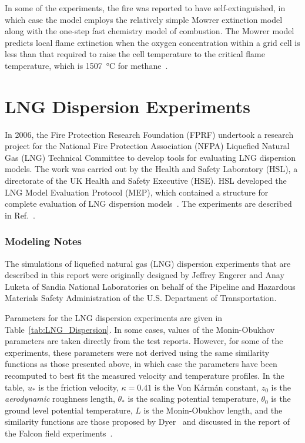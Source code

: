 In some of the experiments, the fire was reported to have self-extinguished, in which case the model employs the relatively simple Mowrer extinction model along with the one-step fast chemistry model of combustion. The Mowrer model predicts local flame extinction when the oxygen concentration within a grid cell is less than that required to raise the cell temperature to the critical flame temperature, which is 1507~\unit{\degreeCelsius} for methane~\cite{SFPE:Beyler}.


\section{LNG Dispersion Experiments}
\label{LNG_Dispersion_Description}

In 2006, the Fire Protection Research Foundation (FPRF) undertook a research project for the National Fire Protection Association (NFPA) Liquefied Natural Gas (LNG) Technical Committee to develop tools for evaluating LNG dispersion models. The work was carried out by the Health and Safety Laboratory (HSL), a directorate of the UK Health and Safety Executive (HSE). HSL developed the LNG Model Evaluation Protocol (MEP), which contained a structure for complete evaluation of LNG dispersion models~\cite{Ivings:HSL}. The experiments are described in Ref.~\cite{Stewart:HSL}.

\subsubsection{Modeling Notes}

The simulations of liquefied natural gas (LNG) dispersion experiments that are described in this report were originally designed by Jeffrey Engerer and Anay Luketa of Sandia National Laboratories on behalf of the Pipeline and Hazardous Materials Safety Administration of the U.S. Department of Transportation.

Parameters for the LNG dispersion experiments are given in Table~\ref{tab:LNG_Dispersion}. In some cases, values of the Monin-Obukhov parameters are taken directly from the test reports. However, for some of the experiments, these parameters were not derived using the same similarity functions as those presented above, in which case the parameters have been recomputed to best fit the measured velocity and temperature profiles. In the table, $u_*$ is the friction velocity, $\kappa=0.41$ is the Von K\'{a}rm\'{a}n constant, $z_0$ is the \emph{aerodynamic} roughness length, $\theta_*$ is the scaling potential temperature, $\theta_0$ is the ground level potential temperature, $L$ is the Monin-Obukhov length, and the similarity functions are those proposed by Dyer~\cite{Dyer:1974} and discussed in the report of the Falcon field experiments~\cite{Falcon}.

